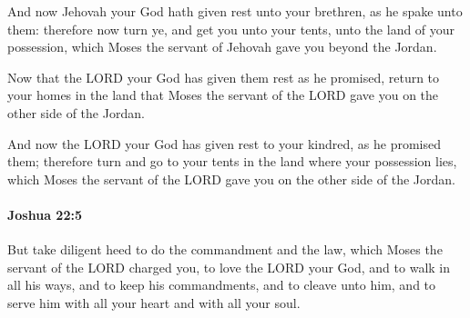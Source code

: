 			\begin{versebox}
					\item[BHS] 
					\item[ASV] And now Jehovah your God hath given rest unto your brethren, as he spake unto them: therefore now turn ye, and get you unto your tents, unto the land of your possession, which Moses the servant of Jehovah gave you beyond the Jordan.
					\item[NIV] Now that the LORD your God has given them rest as he promised, return to your homes in the land that Moses the servant of the LORD gave you on the other side of the Jordan.
					\item[NRSV] And now the LORD your God has given rest to your kindred, as he promised them; therefore turn and go to your tents in the land where your possession lies, which Moses the servant of the LORD gave you on the other side of the Jordan.
			\end{versebox}

		\paragraph{Joshua 22:5} %
			\label{JOSHUA-22-5}

			But take diligent heed to do the commandment and the law, which Moses the servant of the LORD charged you, to love the LORD your God, and to walk in all his ways, and to keep his commandments, and to cleave unto him, and to serve him with all your heart and with all your soul.

